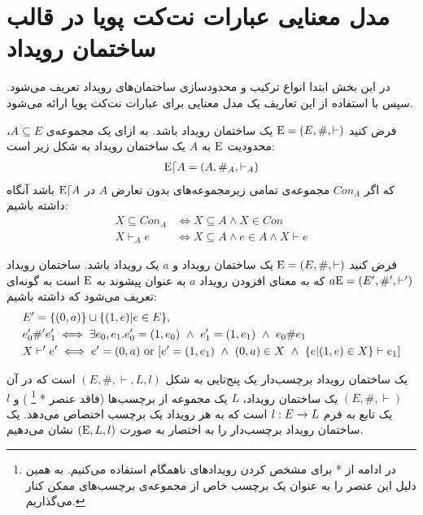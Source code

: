 \section{مدل معنایی عبارات نت‌کت پویا در قالب ساختمان رویداد}
در این بخش ابتدا انواع ترکیب و محدود‌سازی ساختمان‌‌های رویداد تعریف می‌شود.
سپس با استفاده از این تعاریف  یک مدل معنایی برای عبارات نت‌کت پویا ارائه می‌شود.

\begin{definition}
    فرض کنید
    $\mathrm{E} = (E,\#,\vdash)$
    یک ساختمان رویداد باشد.
    به ازای یک مجموعه‌ی
    $A \subseteq E$،
    محدودیت%
    $\mathrm{E}$
    به
    $A$
    یک ساختمان رویداد به شکل زیر است:
    \begin{align*}
        \mathrm{E} \lceil A = (A,\#_A,\vdash_A)
    \end{align*}
    که اگر
    $Con_A$
    مجموعه‌ی تمامی زیرمجموعه‌های بدون تعارض
    $A$
    در
    $\mathrm{E}\lceil A$
    باشد آنگاه داشته باشیم:
    \begin{align*}
        X \subseteq Con_A & \iff X \subseteq A \wedge X \in Con                 \\
        X \vdash_A e      & \iff X \subseteq A \wedge e \in A \wedge X \vdash e
    \end{align*}
\end{definition}

\begin{definition}
    فرض کنید
    $\mathrm{E} = (E,\#,\vdash)$
    یک ساختمان رویداد و
    $a$
    یک رویداد باشد.
    ساختمان رویداد
    $a\mathrm{E} = (E',\#',\vdash')$
    که به معنای افزودن رویداد
    $a$
    به عنوان پیشوند
    به
    $\mathrm{E}$
    است
    به گونه‌ای تعریف می‌شود که داشته باشیم:
    \begin{align*}
         & E' = \s{(0,a)} \cup \s{(1,e)|e \in E},                                                                               \\
         & e_0' \#' e_1'  \iff \exists e_0,e_1.e_0' = (1,e_0)
        \ \wedge \ e_1' = (1,e_1) \ \wedge \ e_0 \# e_1                                                                         \\
         & X \vdash' e' \iff e' = (0,a) \text{ or } [e' = (1,e_1) \ \wedge \ (0,a)\in X \ \wedge \ \s{e|(1,e)\in X} \vdash e_1]
    \end{align*}
\end{definition}

\begin{definition}
    یک ساختمان رویداد برچسب‌دار%
    یک پنج‌تایی به شکل
    $(E,\#,\vdash,L,l)$
    است که در آن
    $(E,\#,\vdash)$
    یک ساختمان رویداد،
    $L$
    یک مجموعه از برچسب‌ها
    (فاقد عنصر *
    \footnote{
        در ادامه از * برای مشخص کردن رویداد‌های ناهمگام استفاده می‌کنیم. به همین دلیل این عنصر را به عنوان یک برچسب خاص از مجموعه‌ی برچسب‌های ممکن کنار می‌گذاریم.
    }
    )
    و
    $l$
    یک تابع به فرم
    $l: E \rightarrow L$
    است که به هر رویداد یک برچسب اختصاص می‌دهد.
    یک ساختمان رویداد برچسب‌دار را به اختصار به صورت
    $(\mathrm{E},L,l)$
    نشان می‌دهیم.
\end{definition}

